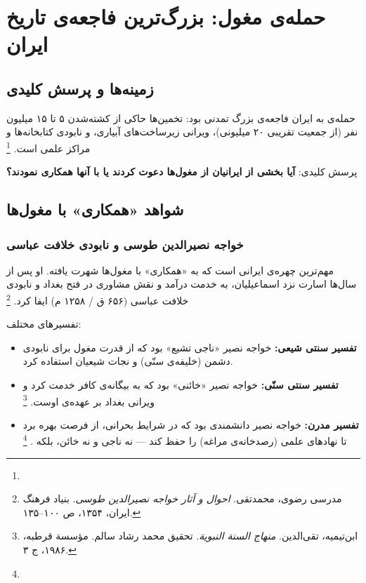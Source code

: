 \section{حمله‌ی مغول: بزرگ‌ترین فاجعه‌ی تاریخ ایران}
\label{sec:ch05-mongol}

\subsection{زمینه‌ها و پرسش کلیدی}
\label{subsec:ch05-mongol-background}

حمله‌ی  به ایران فاجعه‌ی بزرگ تمدنی بود: تخمین‌ها حاکی از کشته‌شدن ۵ تا ۱۵ میلیون نفر (از جمعیت تقریبی ۲۰ میلیونی)، ویرانی زیرساخت‌های آبیاری، و نابودی کتابخانه‌ها و مراکز علمی است.%
\footnote{}

پرسش کلیدی: \textbf{آیا بخشی از ایرانیان از مغول‌ها دعوت کردند یا با آنها همکاری نمودند؟}

\subsection{شواهد «همکاری» با مغول‌ها}
\label{subsec:ch05-mongol-collaboration}

\subsubsection{خواجه نصیرالدین طوسی و نابودی خلافت عباسی}

 مهم‌ترین چهره‌ی ایرانی است که به «همکاری» با مغول‌ها شهرت یافته. او پس از سال‌ها اسارت نزد اسماعیلیان، به خدمت  درآمد و نقش مشاوری در فتح بغداد و نابودی خلافت عباسی (۶۵۶ ق / ۱۲۵۸ م) ایفا کرد.%
\footnote{مدرسی رضوی، محمدتقی. \textit{احوال و آثار خواجه نصیرالدین طوسی}. بنیاد فرهنگ ایران، ۱۳۵۴، ص ۱۰۰--۱۳۵.}

\begin{tcolorbox}[casebox, title={تحلیل: خواجه نصیر — خائن یا عمل‌گرا؟}]
تفسیرهای مختلف:
\begin{itemize}[nosep, rightmargin=1em]
  \item \textbf{تفسیر سنتی شیعی:} خواجه نصیر «ناجی تشیع» بود که از قدرت مغول برای نابودی دشمن (خلیفه‌ی سنّی) و نجات شیعیان استفاده کرد.
  \item \textbf{تفسیر سنتی سنّی:} خواجه نصیر «خائنی» بود که به بیگانه‌ی کافر خدمت کرد و ویرانی بغداد بر عهده‌ی اوست.%
  \footnote{ابن‌تیمیه، تقی‌الدین. \textit{منهاج السنة النبویة}. تحقیق محمد رشاد سالم. مؤسسة قرطبه، ۱۹۸۶، ج ۳.}
  \item \textbf{تفسیر مدرن:} خواجه نصیر دانشمندی بود که در شرایط بحرانی، از فرصت بهره برد تا نهادهای علمی (رصدخانه‌ی مراغه) را حفظ کند — نه ناجی و نه خائن، بلکه .%
  \footnote{}
\end{itemize}
\end{tcolorbox}

